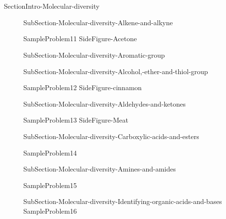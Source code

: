 \documentclass[main.tex]{subfiles}
\newcommand\chapterlabel{Ch-orgo}\setcounter{figurenewcounter}{0}\setcounter{tablenewcounter}{0}\setcounter{formulanewcounter}{0}
\begin{document}
\section{\color{blue!30!black}{Molecular diversity}}
 {SectionIntro-Molecular-diversity}\sloppy
\begin{description}
\item[]{SubSection-Molecular-diversity-Alkene-and-alkyne}

{SampleProblem11}
 {SideFigure-Acetone}

 \item[]{SubSection-Molecular-diversity-Aromatic-group}
 \newpage\vspace{5cm}{Table-Functional-groups}


\item[]{SubSection-Molecular-diversity-Alcohol,-ether-and-thiol-group}

{SampleProblem12}
{SideFigure-cinnamon}

\item[] {SubSection-Molecular-diversity-Aldehydes-and-ketones}

{SampleProblem13}
 {SideFigure-Meat}

\item[]{SubSection-Molecular-diversity-Carboxylic-acids-and-esters}

{SampleProblem14}

 \item[] {SubSection-Molecular-diversity-Amines-and-amides}

{SampleProblem15}
\item[]{SubSection-Molecular-diversity-Identifying-organic-acids-and-bases}
{SampleProblem16}

 \end{description}



\clearpage\thispagestyle{empty}\mbox{}\clearpage
\end{document}
